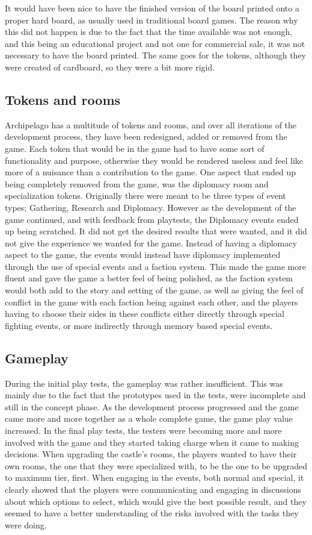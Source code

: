 It would have been nice to have the finished version of the board printed onto a proper hard board, as usually used in traditional board games. The reason why this did not happen is due to the fact that the time available was not enough, and this being an educational project and not one for commercial sale, it was not necessary to have the board printed. The same goes for the tokens, although they were created of cardboard, so they were a bit more rigid.


\subsection{Tokens and rooms}
Archipelago has a multitude of tokens and rooms, and over all iterations of the development process, they have been redesigned, added or removed from the game. Each token that would be in the game had to have some sort of functionality and purpose, otherwise they would be rendered useless and feel like more of a nuisance than a contribution to the game. One aspect that ended up being completely removed from the game, was the diplomacy room and specialization tokens. Originally there were meant to be three types of event types; Gathering, Research and Diplomacy. However as the development of the game continued, and with feedback from playtests, the Diplomacy events ended up being scratched. It did not get the desired results that were wanted, and it did not give the experience we wanted for the game. Instead of having a diplomacy aspect to the game, the events would instead have diplomacy implemented through the use of special events and a faction system. This made the game more fluent and gave the game a better feel of being polished, as the faction system would both add to the story and setting of the game, as well as giving the feel of conflict in the game with each faction being against each other, and the players having to choose their sides in these conflicts either directly through special fighting events, or more indirectly through memory based special events.

\subsection{Gameplay}

During the initial play tests, the gameplay was rather insufficient. This was mainly due to the fact that the prototypes used in the tests, were incomplete and still in the concept phase. 
As the development process progressed and the game came more and more together as a whole complete game, the game play value increased. 
In the final play tests, the testers were becoming more and more involved with the game and they started taking charge when it came to making decisions. 
When upgrading the castle's rooms, the players wanted to have their own rooms, the one that they were specialized with, to be the one to be upgraded to maximum tier, first. 
When engaging in the events, both normal and special, it clearly showed that the players were communicating and engaging in discussions about which options to select, which would give the best possible result, and they seemed to have a better understanding of the risks involved with the tasks they were doing. 

